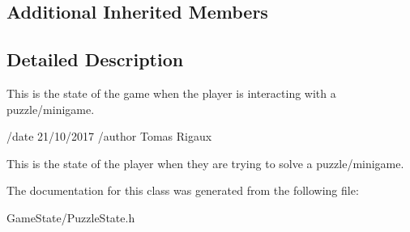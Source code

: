 \subsection*{Additional Inherited Members}


\subsection{Detailed Description}
This is the state of the game when the player is interacting with a puzzle/minigame. 

/date 21/10/2017 /author Tomas Rigaux

This is the state of the player when they are trying to solve a puzzle/minigame. 

The documentation for this class was generated from the following file\-:\begin{DoxyCompactItemize}
\item 
Game\-State/Puzzle\-State.\-h\end{DoxyCompactItemize}
